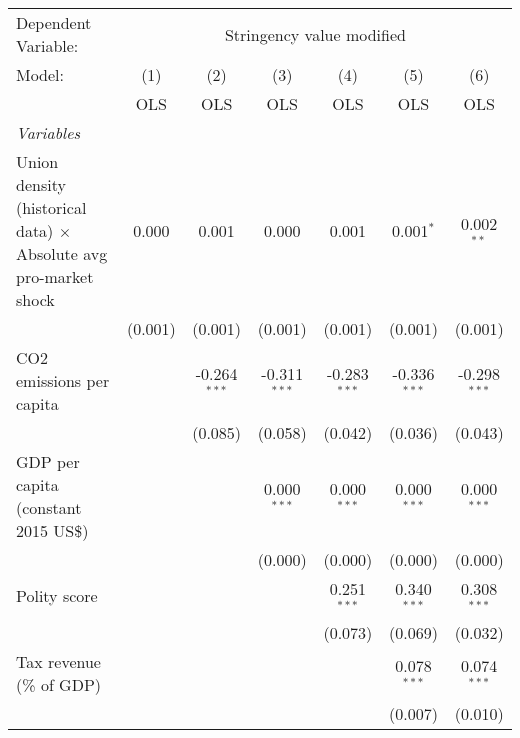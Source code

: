 
\begingroup
\centering
\begin{tabular}{lcccccc}
   \toprule
   Dependent Variable: & \multicolumn{6}{c}{Stringency value modified}\\
   Model:                                                                  & (1)     & (2)            & (3)            & (4)            & (5)            & (6)\\  
                                                                           &  OLS    & OLS            & OLS            & OLS            & OLS            & OLS\\  
   \midrule
   \emph{Variables}\\
   Union density (historical data) $\times$ Absolute avg pro-market shock  & 0.000   & 0.001          & 0.000          & 0.001          & 0.001$^{*}$    & 0.002$^{**}$\\   
                                                                           & (0.001) & (0.001)        & (0.001)        & (0.001)        & (0.001)        & (0.001)\\   
   CO2 emissions per capita                                                &         & -0.264$^{***}$ & -0.311$^{***}$ & -0.283$^{***}$ & -0.336$^{***}$ & -0.298$^{***}$\\   
                                                                           &         & (0.085)        & (0.058)        & (0.042)        & (0.036)        & (0.043)\\   
   GDP per capita (constant 2015 US\$)                                     &         &                & 0.000$^{***}$  & 0.000$^{***}$  & 0.000$^{***}$  & 0.000$^{***}$\\   
                                                                           &         &                & (0.000)        & (0.000)        & (0.000)        & (0.000)\\   
   Polity score                                                            &         &                &                & 0.251$^{***}$  & 0.340$^{***}$  & 0.308$^{***}$\\   
                                                                           &         &                &                & (0.073)        & (0.069)        & (0.032)\\   
   Tax revenue (\% of GDP)                                                 &         &                &                &                & 0.078$^{***}$  & 0.074$^{***}$\\   
                                                                           &         &                &                &                & (0.007)        & (0.010)\\   

\end{tabular}
